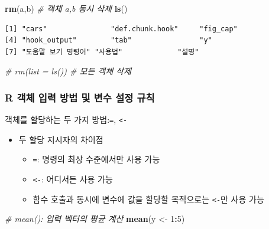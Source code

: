 \documentclass[
  11pt,
]{krantz}
\newenvironment{Shaded}{\begin{snugshade}}{\end{snugshade}}
\newcommand{\CommentTok}[1]{\textcolor[rgb]{0.37,0.37,0.37}{\textit{#1}}}
\newcommand{\DecValTok}[1]{\textcolor[rgb]{0.06,0.06,0.06}{#1}}
\newcommand{\KeywordTok}[1]{\textcolor[rgb]{0.27,0.27,0.27}{\textbf{#1}}}
\newcommand{\NormalTok}[1]{#1}
\newcommand{\OperatorTok}[1]{\textcolor[rgb]{0.43,0.43,0.43}{\textbf{#1}}}
\newcommand{\StringTok}[1]{\textcolor[rgb]{0.5,0.5,0.5}{#1}}
\providecommand{\tightlist}{%
  \setlength{\itemsep}{0pt}\setlength{\parskip}{0pt}}
\begin{document}
\begin{Shaded}
\begin{Highlighting}[]
\KeywordTok{rm}\NormalTok{(a,b) }\CommentTok{# 객체 a,b 동시 삭제}
\KeywordTok{ls}\NormalTok{()}
\end{Highlighting}
\end{Shaded}

\begin{verbatim}
[1] "cars"               "def.chunk.hook"     "fig_cap"           
[4] "hook_output"        "tab"                "y"                 
[7] "도움말 보기 명령어" "사용법"             "설명"              
\end{verbatim}

\begin{Shaded}
\begin{Highlighting}[]
\CommentTok{# rm(list = ls()) # 모든 객체 삭제}
\end{Highlighting}
\end{Shaded}

\normalsize

\hypertarget{r-object-nam-rule}{%
\subsubsection*{R 객체 입력 방법 및 변수 설정 규칙}\label{r-object-nam-rule}}


객체를 할당하는 두 가지 방법:\texttt{=}, \texttt{\textless{}-}

\begin{itemize}
\tightlist
\item
  두 할당 지시자의 차이점

  \begin{itemize}
  \tightlist
  \item
    \texttt{=}: 명령의 최상 수준에서만 사용 가능
  \item
    \texttt{\textless{}-}: 어디서든 사용 가능
  \item
    함수 호출과 동시에 변수에 값을 할당할 목적으로는 \texttt{\textless{}-}만 사용 가능
  \end{itemize}
\end{itemize}

\footnotesize

\begin{Shaded}
\begin{Highlighting}[]
\CommentTok{# mean(): 입력 벡터의 평균 계산}
\KeywordTok{mean}\NormalTok{(y <-}\StringTok{ }\DecValTok{1}\OperatorTok{:}\DecValTok{5}\NormalTok{)}
\end{Highlighting}
\end{Shaded}
\end{document}
